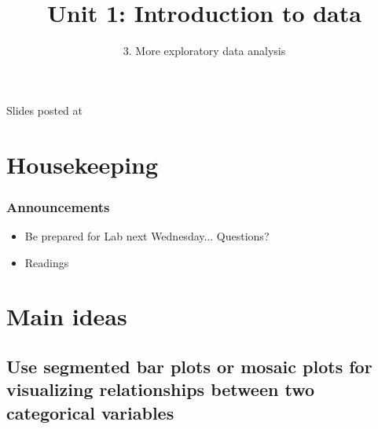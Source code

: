 \documentclass[compress,11pt,t,professionalfonts,xcolor=table]{beamer}
\title{Unit 1: Introduction to data}
\subtitle{3. More exploratory data analysis}
\author{\CourseName}
\date{}
\institute{\InstituteName}
\begin{document}



\begin{frame}[plain]

\titlepage

\vfill

{\scriptsize \webLink{\PersonalSite}{\FirstName{} \LastName{}} \hfill Slides posted at  \webURL{\CourseSite}}

\addtocounter{framenumber}{-1} 

\end{frame}


\section{Housekeeping}


\begin{frame}
\frametitle{Announcements}

\begin{itemize}

\item Be prepared for Lab  next Wednesday... \pause Questions? \pause
\item Readings

\end{itemize}

\end{frame}


\section{Main ideas}






\subsection{Use segmented bar plots or mosaic plots for visualizing relationships between two categorical variables}
\label{mi1}

\end{document}
